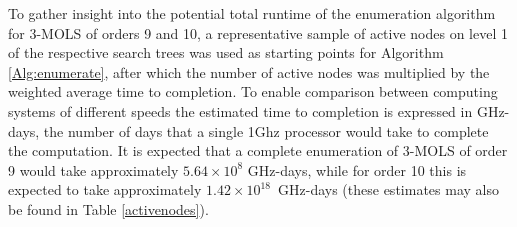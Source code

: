 \documentclass[11pt, a4paper]{article}
\newcounter{ls}
\begin{document}
To gather insight into the potential total runtime of the enumeration algorithm for $3$-MOLS of orders 9 and 10, a representative sample of active nodes on level 1 of the respective search trees   was used as starting points for Algorithm \ref{Alg:enumerate}, after which %
the   number of active nodes was multiplied by the weighted average time to completion. To enable comparison between computing systems of different speeds the estimated time to completion is expressed in GHz-days, the number of days that a single 1Ghz processor would take to complete the computation. It is expected that a complete enumeration of $3$-MOLS of order 9 would take approximately $5.64\times 10^{8}$ GHz-days, while for order 10 this is expected to  take approximately $1.42\times 10^{18}$~GHz-days (these estimates may also be found in Table \ref{activenodes}).
\end{document}
